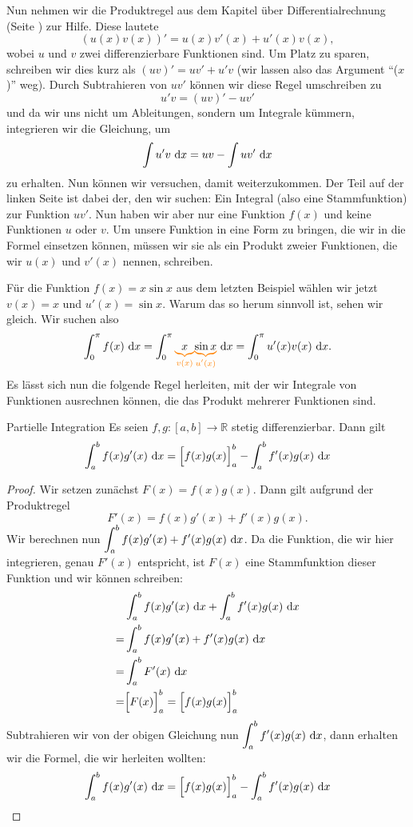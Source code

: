 \documentclass[../../main.tex]{subfiles}
\begin{document}
Nun nehmen wir die Produktregel aus dem Kapitel über Differentialrechnung (Seite \pageref{produktregel}) zur Hilfe. Diese lautete
\[(u(x)v(x))'=u(x)v'(x)+u'(x)v(x),\]
wobei $u$ und $v$ zwei differenzierbare Funktionen sind. Um Platz zu sparen, schreiben wir dies kurz als $(uv)'=uv'+u'v$ 
(wir lassen also das Argument \enquote{($x$)} weg).
Durch Subtrahieren von $uv'$ können wir diese Regel 
umschreiben zu
\[u'v=(uv)'-uv'\]
und da wir uns nicht um Ableitungen, sondern um Integrale kümmern, integrieren wir die Gleichung, um
\[\int u'v\mathop{}\mathrm{d} x=uv-\int uv'\mathop{}\mathrm{d} x\]
zu erhalten. Nun können wir versuchen, damit weiterzukommen. Der Teil auf der linken Seite ist dabei der, den wir 
suchen: Ein Integral (also eine Stammfunktion) zur Funktion $uv'$. Nun haben wir aber nur eine Funktion $f(x)$ und keine 
Funktionen $u$ oder $v$. Um unsere Funktion in eine Form zu bringen, die wir in die Formel einsetzen können, müssen 
wir sie als ein Produkt zweier Funktionen, die wir $u(x)$ und $v'(x)$ nennen, schreiben.
\begin{example}{}
    Für die Funktion $f(x)=x\sin x$ aus dem letzten Beispiel wählen wir jetzt $v(x)=x$ und $u'(x)=\sin x$. 
    Warum das so herum sinnvoll ist, sehen wir gleich. Wir suchen also
    \[\int_0^\pi f(x)\diff x=\int_0^\pi\colorbrace{x}{v(x)}\colorbrace{\sin x}{u'(x)}\diff x=\int_0^\pi u'(x)v(x)\diff x.\]
\end{example}
Es lässt sich nun die folgende Regel herleiten, mit der wir Integrale von Funktionen ausrechnen können, die das Produkt
mehrerer Funktionen sind.
\begin{theorem}{Partielle Integration}
    Es seien $f,g:[a,b]\rightarrow\mathbb{R}$ stetig differenzierbar. Dann gilt
    \[\int_a^b f(x)g'(x)\mathop{}\mathrm{d} x=\Bigl[f(x)g(x)\Bigr]_a^b-\int_a^b f'(x)g(x)\mathop{}\mathrm{d} x\]
\end{theorem}
\begin{proof}
    Wir setzen zunächst $F(x)=f(x)g(x)$. Dann gilt aufgrund der Produktregel \[F'(x)=f(x)g'(x)+f'(x)g(x).\] 
    Wir berechnen nun $\displaystyle\int_a^b f(x)g'(x)+f'(x)g(x)\mathop{}\mathrm{d} x$. Da die Funktion, die wir hier integrieren, 
    genau $F'(x)$ entspricht, ist $F(x)$ eine Stammfunktion dieser Funktion und wir können schreiben:
    \begin{align*}
        &\int_a^b f(x)g'(x)\mathop{}\mathrm{d} x+\int_a^b f'(x)g(x)\mathop{}\mathrm{d} x\\
        =&\int_a^b f(x)g'(x)+f'(x)g(x)\mathop{}\mathrm{d} x\\
        =&\int_a^b F'(x)\mathop{}\mathrm{d} x\\
        =&\Bigl[F(x)\Bigr]_a^b=\Bigl[f(x)g(x)\Bigr]_a^b
    \end{align*}
    Subtrahieren wir von der obigen Gleichung nun $\displaystyle\int_a^b f'(x)g(x)\mathop{}\mathrm{d} x$, dann erhalten wir die Formel,
    die wir herleiten wollten:
    \[\int_a^b f(x)g'(x)\mathop{}\mathrm{d} x=\Bigl[f(x)g(x)\Bigr]_a^b-\int_a^b f'(x)g(x)\mathop{}\mathrm{d} x\qedhere\]
\end{proof}
\end{document}
